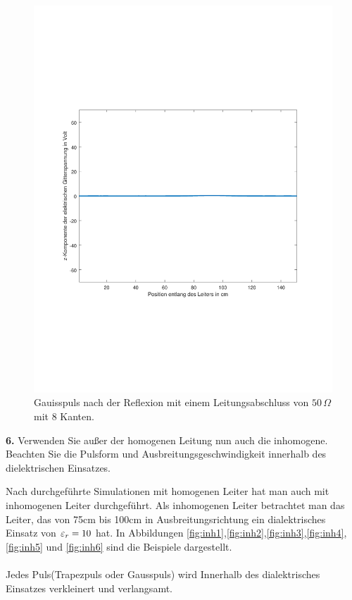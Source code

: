 \documentclass[Protokollheft.tex]{subfiles}
\begin{document}
\begin{figure}[ht]
	\centering
	\includegraphics[trim = 20mm 65mm 20mm 65mm, clip,width=0.7\linewidth]{untitled6.pdf}
	\caption{Gauisspuls nach der Reflexion mit einem Leitungsabschluss von $50\,\Omega$ mit 8 Kanten.}\label{fig:gauss6}
\end{figure}


\begin{framed}
	\noindent \textbf{6.} Verwenden Sie außer der homogenen Leitung nun auch die
inhomogene. Beachten Sie die Pulsform und
Ausbreitungsgeschwindigkeit innerhalb des dielektrischen
Einsatzes.\label{exer:inhomogenTLine}
\end{framed}

Nach durchgeführte Simulationen mit homogenen Leiter hat man auch mit inhomogenen Leiter durchgeführt. Als inhomogenen Leiter betrachtet man das Leiter, das von 75cm bis 100cm in Ausbreitungsrichtung ein dialektrisches Einsatz von $\varepsilon_r=10$ hat. In Abbildungen \ref{fig:inh1},\ref{fig:inh2},\ref{fig:inh3},\ref{fig:inh4},\ref{fig:inh5} und \ref{fig:inh6} sind die Beispiele dargestellt. \\ \\
Jedes Puls(Trapezpuls oder Gausspuls) wird Innerhalb des dialektrisches Einsatzes verkleinert und verlangsamt.
\end{document}
